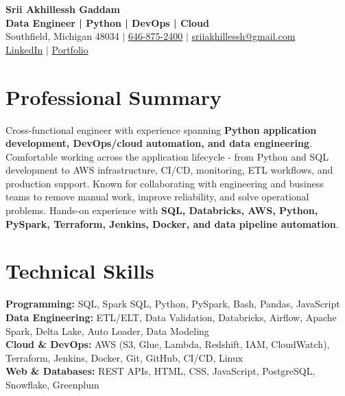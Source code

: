 \documentclass[letterpaper,10pt]{article}
\begin{document}
\fontsize{9.35pt}{10.45pt}\selectfont

\begin{center}
    {\LARGE \textbf{Srii Akhillessh Gaddam}} \\[-1pt]
    \textbf{Data Engineer | Python | DevOps | Cloud} \\[2pt]
    Southfield, Michigan 48034 $|$
    \href{tel:6468752400}{646-875-2400} $|$
    \href{mailto:sriiakhillessh@gmail.com}{sriiakhillessh@gmail.com} \\[1pt]
    \href{https://www.linkedin.com/in/srii-akhiilessh-gaddam-b48668191/}{LinkedIn} $|$
    \href{https://sriiakhillesshg.github.io/portfolio/}{Portfolio}
\end{center}
\vspace{-8pt}

\section{Professional Summary}
\small{Cross-functional engineer with experience spanning \textbf{Python application development, DevOps/cloud automation, and data engineering}. Comfortable working across the application lifecycle - from Python and SQL development to AWS infrastructure, CI/CD, monitoring, ETL workflows, and production support. Known for collaborating with engineering and business teams to remove manual work, improve reliability, and solve operational problems. Hands-on experience with \textbf{SQL, Databricks, AWS, Python, PySpark, Terraform, Jenkins, Docker, and data pipeline automation}.}

\section{Technical Skills}
\small{
\textbf{Programming:} SQL, Spark SQL, Python, PySpark, Bash, Pandas, JavaScript \\
\textbf{Data Engineering:} ETL/ELT, Data Validation, Databricks, Airflow, Apache Spark, Delta Lake, Auto Loader, Data Modeling \\
\textbf{Cloud \& DevOps:} AWS (S3, Glue, Lambda, Redshift, IAM, CloudWatch), Terraform, Jenkins, Docker, Git, GitHub, CI/CD, Linux \\
\textbf{Web \& Databases:} REST APIs, HTML, CSS, JavaScript, PostgreSQL, Snowflake, Greenplum
}

\end{document}
